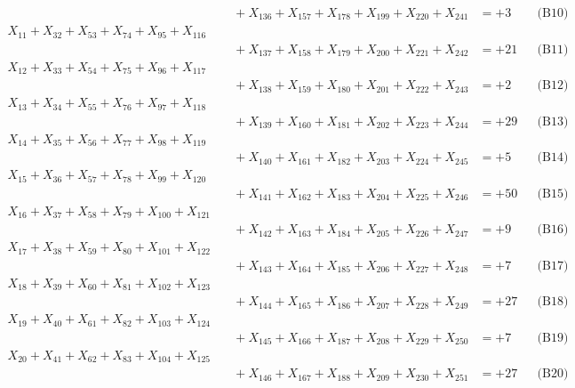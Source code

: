 \documentclass[a4paper,10pt]{article}
\begin{document}
{\begin{align}
&\quad  + X_{136} + X_{157} + X_{178} + X_{199} + X_{220} + X_{241} &= +3 && \text{(B10)} \\
X_{11} + X_{32} + X_{53} + X_{74} + X_{95} + X_{116} \\[0.1ex]
&\quad  + X_{137} + X_{158} + X_{179} + X_{200} + X_{221} + X_{242} &= +21 && \text{(B11)} \\
X_{12} + X_{33} + X_{54} + X_{75} + X_{96} + X_{117} \\[0.1ex]
&\quad  + X_{138} + X_{159} + X_{180} + X_{201} + X_{222} + X_{243} &= +2 && \text{(B12)} \\
\allowbreak
X_{13} + X_{34} + X_{55} + X_{76} + X_{97} + X_{118} \\[0.1ex]
&\quad  + X_{139} + X_{160} + X_{181} + X_{202} + X_{223} + X_{244} &= +29 && \text{(B13)} \\
X_{14} + X_{35} + X_{56} + X_{77} + X_{98} + X_{119} \\[0.1ex]
&\quad  + X_{140} + X_{161} + X_{182} + X_{203} + X_{224} + X_{245} &= +5 && \text{(B14)} \\
X_{15} + X_{36} + X_{57} + X_{78} + X_{99} + X_{120} \\[0.1ex]
&\quad  + X_{141} + X_{162} + X_{183} + X_{204} + X_{225} + X_{246} &= +50 && \text{(B15)} \\
X_{16} + X_{37} + X_{58} + X_{79} + X_{100} + X_{121} \\[0.1ex]
&\quad  + X_{142} + X_{163} + X_{184} + X_{205} + X_{226} + X_{247} &= +9 && \text{(B16)} \\
X_{17} + X_{38} + X_{59} + X_{80} + X_{101} + X_{122} \\[0.1ex]
&\quad  + X_{143} + X_{164} + X_{185} + X_{206} + X_{227} + X_{248} &= +7 && \text{(B17)} \\
\allowbreak
X_{18} + X_{39} + X_{60} + X_{81} + X_{102} + X_{123} \\[0.1ex]
&\quad  + X_{144} + X_{165} + X_{186} + X_{207} + X_{228} + X_{249} &= +27 && \text{(B18)} \\
X_{19} + X_{40} + X_{61} + X_{82} + X_{103} + X_{124} \\[0.1ex]
&\quad  + X_{145} + X_{166} + X_{187} + X_{208} + X_{229} + X_{250} &= +7 && \text{(B19)} \\
X_{20} + X_{41} + X_{62} + X_{83} + X_{104} + X_{125} \\[0.1ex]
&\quad  + X_{146} + X_{167} + X_{188} + X_{209} + X_{230} + X_{251} &= +27 && \text{(B20)} \\
\end{align}
}
\end{document}
